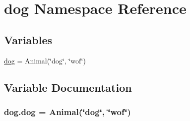 \hypertarget{namespacedog}{}\section{dog Namespace Reference}
\label{namespacedog}
\subsection*{Variables}
\begin{DoxyCompactItemize}
\item 
\hyperlink{namespacedog_a2b2a4986eb208572451a7aca2f00a9ae}{dog} = Animal(\char`\"{}dog\char`\"{}, \char`\"{}wof\char`\"{})
\end{DoxyCompactItemize}


\subsection{Variable Documentation}
\subsubsection[{\texorpdfstring{dog}{dog}}]{\setlength{\rightskip}{0pt plus 5cm}dog.\+dog = Animal(\char`\"{}dog\char`\"{}, \char`\"{}wof\char`\"{})}\hypertarget{namespacedog_a2b2a4986eb208572451a7aca2f00a9ae}{}\label{namespacedog_a2b2a4986eb208572451a7aca2f00a9ae}
